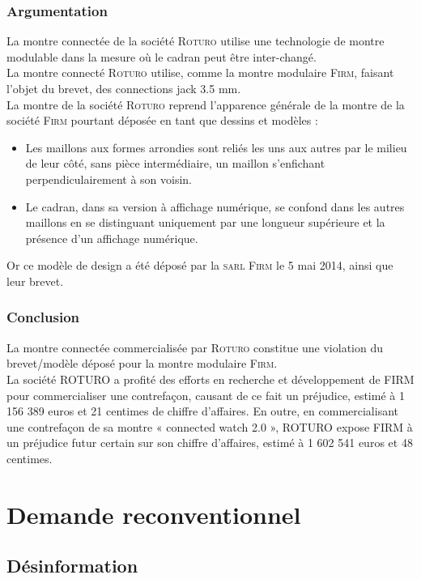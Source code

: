 \subsubsection{Argumentation}
La montre connectée de la société \textsc{Roturo} utilise une technologie de montre modulable dans la mesure où le cadran peut être inter-changé. \\
La montre connecté \textsc{Roturo} utilise, comme la montre modulaire \textsc{Firm}, faisant l’objet du brevet, des connections jack 3.5 mm.\\
La montre de la société \textsc{Roturo} reprend l'apparence générale de la montre de la société \textsc{Firm} pourtant déposée en tant que dessins et modèles :\\
\begin{itemize}
\item Les maillons aux formes arrondies sont reliés les uns aux autres par le milieu de leur côté, sans pièce intermédiaire, un maillon s'enfichant perpendiculairement à son voisin.\\
\item Le cadran, dans sa version à affichage numérique, se confond dans les autres maillons en se 
distinguant uniquement par une longueur supérieure et la présence d’un affichage numérique.
\end{itemize}
Or ce modèle de design a été déposé par la \textsc{sarl Firm} le 5 mai 2014, ainsi que leur brevet.
\subsubsection{Conclusion}
La montre connectée commercialisée par \textsc{Roturo} constitue une violation du brevet/modèle déposé pour la montre modulaire \textsc{Firm}.\\
La société ROTURO a profité des efforts en recherche et développement de FIRM pour commercialiser une contrefaçon, causant de ce fait un préjudice, estimé à 1 156 389 euros  et 21 centimes de chiffre d'affaires. En outre, en commercialisant une contrefaçon de sa montre « connected watch 2.0 », ROTURO expose FIRM à un préjudice futur certain sur son chiffre d'affaires, estimé à 1 602 541 euros et 48 centimes. 

\section{Demande reconventionnel}

\subsection{Désinformation}

